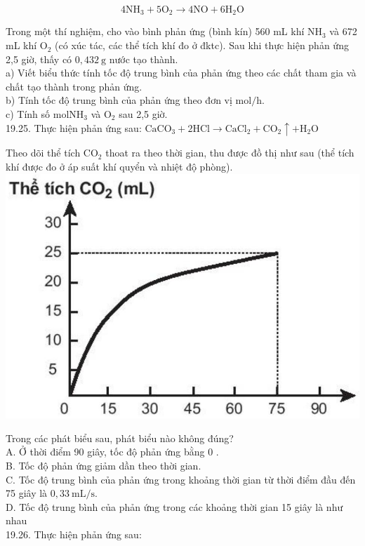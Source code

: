 \documentclass[10pt]{article}
\begin{document}
$$
4 \mathrm{NH}_{3}+5 \mathrm{O}_{2} \rightarrow 4 \mathrm{NO}+6 \mathrm{H}_{2} \mathrm{O}
$$

Trong một thí nghiệm, cho vào bình phản ứng (bình kín) 560 mL khí $\mathrm{NH}_{3}$ và 672 mL khí $\mathrm{O}_{2}$ (có xúc tác, các thể tích khí đo ở đktc). Sau khi thực hiện phản ứng 2,5 giờ, thấy có $0,432 \mathrm{~g}$ nước tạo thành.\\
a) Viết biểu thức tính tốc độ trung bình của phản ứng theo các chất tham gia và chất tạo thành trong phản ứng.\\
b) Tính tốc độ trung bình của phản ứng theo đơn vị $\mathrm{mol} / \mathrm{h}$.\\
c) Tính số $\mathrm{mol} \mathrm{NH}_{3}$ và $\mathrm{O}_{2}$ sau 2,5 giờ.\\
19.25. Thực hiện phản ứng sau: $\mathrm{CaCO}_{3}+2 \mathrm{HCl} \rightarrow \mathrm{CaCl}_{2}+\mathrm{CO}_{2} \uparrow+\mathrm{H}_{2} \mathrm{O}$

Theo dõi thể tích $\mathrm{CO}_{2}$ thoat ra theo thời gian, thu được đồ thị như sau (thể tích khí được đo ở áp suất khí quyển và nhiệt độ phòng).\\
\includegraphics[max width=\textwidth, center]{2025_10_23_daab5c8457c85b365b9eg-54}

Trong các phát biểu sau, phát biểu nào không đúng?\\
A. Ở thời điểm 90 giây, tốc độ phản ứng bằng 0 .\\
B. Tốc độ phản ứng giảm dần theo thời gian.\\
C. Tốc độ trung bình của phản ứng trong khoảng thời gian từ thời điểm đầu đến 75 giây là $0,33 \mathrm{~mL} / \mathrm{s}$.\\
D. Tốc độ trung bình của phản ứng trong các khoảng thời gian 15 giây là như nhau\\
19.26. Thực hiện phản ứng sau:
\end{document}
